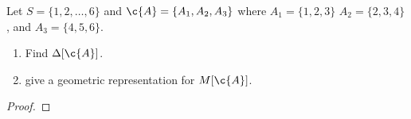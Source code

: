 \prob
{
    Let $S = \{1, 2, \dots, 6\}$ and $\c{A} = \{A_1, A_2, A_3\}$ where $A_1 = \{1, 2, 3\}$
    $A_2 = \{2, 3, 4\}$, and $A_3 = \{4, 5, 6\}$.
    \begin{enumerate}[label=(\roman*)]
        \item   Find $\Delta[\c{A}]$.
        \item   give a geometric representation for $M[\c{A}]$.
    \end{enumerate}
}
\begin{proof}

\end{proof}